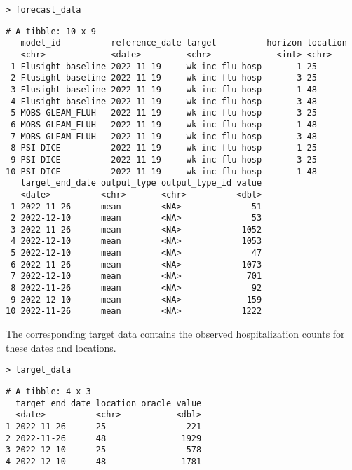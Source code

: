 \documentclass[
  article,
  shortnames,
  notitle]{jss}
\begin{document}
\begin{verbatim}
> forecast_data
\end{verbatim}

\small

\begin{verbatim}
# A tibble: 10 x 9
   model_id          reference_date target          horizon location
   <chr>             <date>         <chr>             <int> <chr>   
 1 Flusight-baseline 2022-11-19     wk inc flu hosp       1 25      
 2 Flusight-baseline 2022-11-19     wk inc flu hosp       3 25      
 3 Flusight-baseline 2022-11-19     wk inc flu hosp       1 48      
 4 Flusight-baseline 2022-11-19     wk inc flu hosp       3 48      
 5 MOBS-GLEAM_FLUH   2022-11-19     wk inc flu hosp       3 25      
 6 MOBS-GLEAM_FLUH   2022-11-19     wk inc flu hosp       1 48      
 7 MOBS-GLEAM_FLUH   2022-11-19     wk inc flu hosp       3 48      
 8 PSI-DICE          2022-11-19     wk inc flu hosp       1 25      
 9 PSI-DICE          2022-11-19     wk inc flu hosp       3 25      
10 PSI-DICE          2022-11-19     wk inc flu hosp       1 48      
   target_end_date output_type output_type_id value
   <date>          <chr>       <chr>          <dbl>
 1 2022-11-26      mean        <NA>              51
 2 2022-12-10      mean        <NA>              53
 3 2022-11-26      mean        <NA>            1052
 4 2022-12-10      mean        <NA>            1053
 5 2022-12-10      mean        <NA>              47
 6 2022-11-26      mean        <NA>            1073
 7 2022-12-10      mean        <NA>             701
 8 2022-11-26      mean        <NA>              92
 9 2022-12-10      mean        <NA>             159
10 2022-11-26      mean        <NA>            1222
\end{verbatim}

\normalsize

The corresponding target data contains the observed hospitalization
counts for these dates and locations.

\begin{verbatim}
> target_data
\end{verbatim}

\small

\begin{verbatim}
# A tibble: 4 x 3
  target_end_date location oracle_value
  <date>          <chr>           <dbl>
1 2022-11-26      25                221
2 2022-11-26      48               1929
3 2022-12-10      25                578
4 2022-12-10      48               1781
\end{verbatim}
\end{document}

